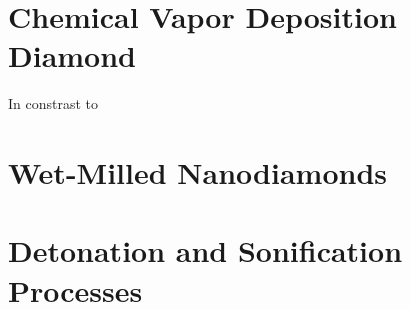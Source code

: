 	\section{Chemical Vapor Deposition Diamond}

	In constrast to 	

	\section{Wet-Milled Nanodiamonds}
	\section{Detonation and Sonification Processes}